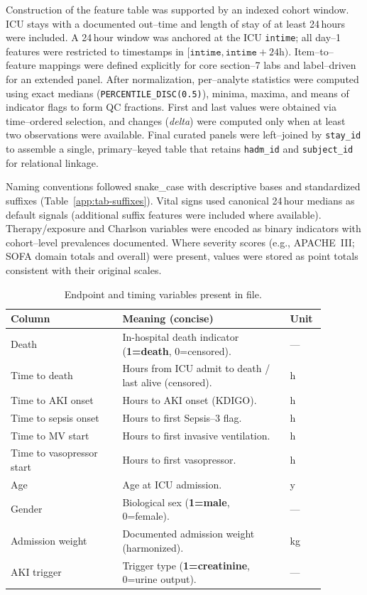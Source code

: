 \medskip
\noindent Construction of the feature table was supported by an indexed cohort window. ICU stays with a documented out--time and length of stay of at least 24\,hours were included. A 24\,hour window was anchored at the ICU \texttt{intime}; all day–1 features were restricted to timestamps in $[\texttt{intime},\texttt{intime}+24\text{h})$. Item–to–feature mappings were defined explicitly for core section–7 labs and label–driven for an extended panel. After normalization, per–analyte statistics were computed using exact medians (\texttt{PERCENTILE\_DISC(0.5)}), minima, maxima, and means of indicator flags to form QC fractions. First and last values were obtained via time–ordered selection, and changes (\textit{delta}) were computed only when at least two observations were available. Final curated panels were left–joined by \texttt{stay\_id} to assemble a single, primary–keyed table that retains \texttt{hadm\_id} and \texttt{subject\_id} for relational linkage.

\medskip
\noindent Naming conventions followed snake\_case with descriptive bases and standardized suffixes (Table~\ref{app:tab-suffixes}). Vital signs used canonical 24\,hour medians as default signals (additional suffix features were included where available). Therapy/exposure and Charlson variables were encoded as binary indicators with cohort–level prevalences documented. Where severity scores (e.g., APACHE~III; SOFA domain totals and overall) were present, values were stored as point totals consistent with their original scales.

\vspace{0.75\baselineskip}
\begin{table}[t]\centering
{\small\renewcommand{\arraystretch}{1.12}\setlength{\tabcolsep}{6pt}%
\caption{Endpoint and timing variables present in file.}
\label{app:tab-endpoint-times}
\begin{tabular}{P{0.32\linewidth} P{0.48\linewidth} P{0.08\linewidth}}
\toprule
\textbf{Column} & \textbf{Meaning (concise)} & \textbf{Unit}\\
\midrule
Death & In-hospital death indicator (\textbf{1=death}, 0=censored). & ---\\
Time to death & Hours from ICU admit to death / last alive (censored). & h\\
Time to AKI onset & Hours to AKI onset (KDIGO). & h\\
Time to sepsis onset & Hours to first Sepsis--3 flag. & h\\
Time to MV start & Hours to first invasive ventilation. & h\\
Time to vasopressor start & Hours to first vasopressor. & h\\
Age & Age at ICU admission. & y\\
Gender & Biological sex (\textbf{1=male}, 0=female). & ---\\
Admission weight & Documented admission weight (harmonized). & kg\\
AKI trigger & Trigger type (\textbf{1=creatinine}, 0=urine output). & ---\\
\bottomrule
\end{tabular}}
\end{table}

